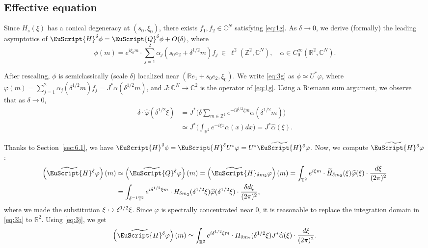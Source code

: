 \documentclass[JEP,XML,SOM,Unicode,NoFloatCountersInSection]{cedram}
\let\pazocal\EuScript
\def\mto{\mathchoice{\longmapsto}{\mapsto}{\mapsto}{\mapsto}}
\theoremstyle{definition}
\newcommand{\QQ}{{\pazocal{Q}}}
\newcommand{\HH}{\pazocal{H}}
\newcommand{\tHH}{\widetilde{\HH}{}}
\newcommand{\tQQ}{\widetilde{\QQ}{}}
\newcommand{\C}{\mathbb{C}}
\newcommand{\R}{\mathbb{R}}
\newcommand{\Z}{\mathbb{Z}}
\newcommand{\Tt}{{\mathbb{T}}}
\let\az\alpha
\let\vp\varphi
\newcommand{\tH}{{\widetilde{H}}}
\newcommand{\hvp}{{\widehat{\vp}}}
\newcommand{\haz}{{\widehat{\az}}}
\begin{document}
\subsection{Effective equation} Since $H_s(\xi)$ has a conical degeneracy at $(s_0,\xi_0)$, there exists $f_1, f_2 \in \C^N$ satisfying \eqref{eq:1g}. As $\delta \to 0$, we derive (formally) the leading asymptotics of $\HH^\delta \phi = \QQ^\delta \phi + O(\delta)$, where
\begin{equation}\label{eq:3g}
\phi(m) = e^{i\xi_0 m} \cdot \sum_{j=1}^2 \az_j(s_0 e_2+\delta^{1/2} m) f_j \ \in \ \ell^2(\Z^2,\C^N), \quad \az \in C_0^\infty(\R^2,\C^N).
\end{equation}

After rescaling, $\phi$ is semiclassically (scale $\delta$) localized near $(\R e_1 + s_0e_2,\xi_0)$.
We write \eqref{eq:3g} as $\phi \simeq U^* \vp$, where $\vp(m) = \sum_{j=1}^2 \az_j(\delta^{1/2} m) f_j = J^* \az(\delta^{1/2} m)$,
and $J : \C^N \to \C^2$ is the operator of \eqref{eq:1g}. Using a Riemann sum argument, we observe that as $\delta \to 0$,
\begin{equation}\label{eq:3j}
\begin{split}
\delta \cdot \hvp(\delta^{1/2} \xi) &= J^* \biggl( \delta \sum_{m \in \Z^2} e^{-i \delta^{1/2} \xi m} \az(\delta^{1/2} m) \biggr)\\
&\simeq J^* \biggl( \int_{\R^2} e^{-i \xi x} \az(x) dx\biggr) = J^* \haz(\xi).
\end{split}
\end{equation}

Thanks to Section~\ref{sec:6.1}, we have $\HH^\delta \phi = \HH^\delta U^* \vp = U^* \tHH^\delta \vp$. Now, we compute $\tHH^\delta \vp$:
\begin{equation}\label{eq:3h}
\begin{split}
\left(\tHH^\delta \vp \right)(m) &\simeq \left(\tQQ^\delta \vp\right)(m) = \left(\tHH_{\delta m_2} \vp\right)(m) = \int_{\Tt^2} e^{i\xi m} \cdot \tH_{\delta m_2}(\xi) \hvp(\xi) \cdot \dfrac{d\xi}{(2\pi)^2}
\\
&= \int_{\delta^{-1} \Tt^2} e^{i\delta^{1/2} \xi m} \cdot H_{\delta m_2}(\delta^{1/2} \xi) \hvp(\delta^{1/2} \xi) \cdot \dfrac{\delta d\xi}{(2\pi)^2},
\end{split}
\end{equation}
where we made the substitution $\xi \mto \delta^{1/2} \xi$. Since $\vp$ is spectrally concentrated near $0$, it is reasonable to replace the integration domain in \eqref{eq:3h} to $\R^2$. Using \eqref{eq:3j}, we get
\begin{equation}\label{eq:3m}
\left(\tHH^\delta \vp \right)(m) \simeq \int_{\R^2} e^{i\delta^{1/2} \xi m} \cdot H_{\delta m_2}(\delta^{1/2} \xi) J^* \haz(\xi) \cdot \dfrac{d\xi}{(2\pi )^2}.
\end{equation}
\end{document}
